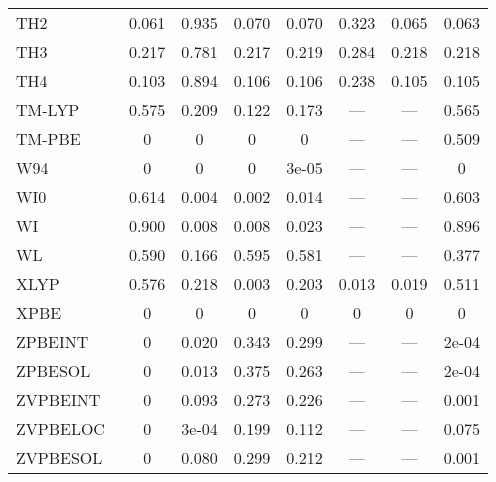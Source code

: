 \begin{table*}
\begin{tabular}{|l|c|c|c|c|c|c|c|}
TH2~\cite{Tozer1998_3162} & 0.061 & 0.935 & 0.070 & 0.070 & 0.323 & 0.065 & 0.063 \\
TH3~\cite{Handy1998_707} & 0.217 & 0.781 & 0.217 & 0.219 & 0.284 & 0.218 & 0.218 \\
TH4~\cite{Handy1998_707} & 0.103 & 0.894 & 0.106 & 0.106 & 0.238 & 0.105 & 0.105 \\
TM-LYP~\cite{Thakkar2009_134109} & 0.575 & 0.209 & 0.122 & 0.173 & --- & --- & 0.565 \\
TM-PBE~\cite{Thakkar2009_134109} & 0 & 0 & 0 & 0 & --- & --- & 0.509 \\
W94~\cite{Wilson1994_337} & 0 & 0 & 0 & 3e-05 & --- & --- & 0 \\
WI0~\cite{Wilson1998_523} & 0.614 & 0.004 & 0.002 & 0.014 & --- & --- & 0.603 \\
WI~\cite{Wilson1998_523} & 0.900 & 0.008 & 0.008 & 0.023 & --- & --- & 0.896 \\
WL~\cite{Wilson1990_12930} & 0.590 & 0.166 & 0.595 & 0.581 & --- & --- & 0.377 \\
XLYP~\cite{Xu2004_2673} & 0.576 & 0.218 & 0.003 & 0.203 & 0.013 & 0.019 & 0.511 \\
XPBE~\cite{Xu2004_4068} & 0 & 0 & 0 & 0 & 0 & 0 & 0 \\
ZPBEINT~\cite{Constantin2011_233103} & 0 & 0.020 & 0.343 & 0.299 & --- & --- & 2e-04 \\
ZPBESOL~\cite{Constantin2011_233103} & 0 & 0.013 & 0.375 & 0.263 & --- & --- & 2e-04 \\
ZVPBEINT~\cite{Constantin2012_194105} & 0 & 0.093 & 0.273 & 0.226 & --- & --- & 0.001 \\
ZVPBELOC~\cite{Fabiano2015_122} & 0 & 3e-04 & 0.199 & 0.112 & --- & --- & 0.075 \\
ZVPBESOL~\cite{Constantin2012_194105} & 0 & 0.080 & 0.299 & 0.212 & --- & --- & 0.001 \\
\bottomrule
\end{tabular}
\end{table*}
